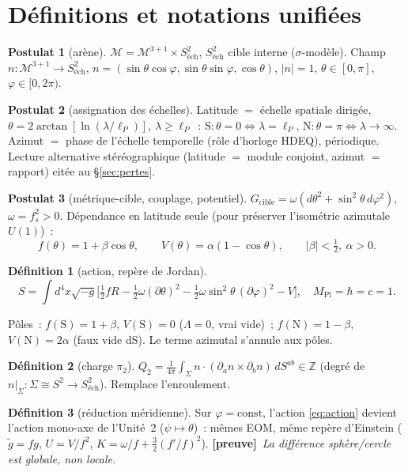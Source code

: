 \documentclass[11pt]{article}
\newcommand{\preuve}{{\small\textbf{[preuve]}}}
\newcommand{\Spole}{\mathrm{S}}
\newcommand{\Npole}{\mathrm{N}}
\newcommand{\Mp}{M_{\mathrm{Pl}}}
\newcommand{\lP}{\ell_P}
\newcommand{\Stwo}{S^2_{\text{\'ech}}}
\theoremstyle{definition}
\newtheorem{post}{Postulat}
\newtheorem{defi}{D\'efinition}
\begin{document}
\section{D\'efinitions et notations unifi\'ees}
\begin{post}[ar\`ene]\label{P1}
$\mathcal{M}=\mathcal{M}^{3+1}\times\Stwo$, $\Stwo$ cible interne ($\sigma$-mod\`ele). Champ
$n:\mathcal{M}^{3+1}\to\Stwo$, $n=(\sin\theta\cos\varphi,\sin\theta\sin\varphi,\cos\theta)$, $|n|=1$,
$\theta\in[0,\pi]$, $\varphi\in[0,2\pi)$.
\end{post}
\begin{post}[assignation des \'echelles]\label{P2}
Latitude $=$ \'echelle spatiale dirig\'ee, $\theta=2\arctan[\ln(\lambda/\lP)]$, $\lambda\ge\lP$~:
$\Spole:\theta{=}0\Leftrightarrow\lambda{=}\lP$, $\Npole:\theta{=}\pi\Leftrightarrow\lambda{\to}\infty$.
Azimut $=$ phase de l'\'echelle temporelle (r\^ole d'horloge HDEQ), p\'eriodique. Lecture alternative
st\'er\'eographique (latitude $=$ module conjoint, azimut $=$ rapport) cit\'ee au \S\ref{sec:pertes}.
\end{post}
\begin{post}[m\'etrique-cible, couplage, potentiel]\label{P3}
$G_{\text{cible}}=\omega(d\theta^2+\sin^2\!\theta\,d\varphi^2)$, $\omega=f_s^2>0$. D\'ependance en
latitude seule (pour pr\'eserver l'isom\'etrie azimutale $U(1)$)~:
\begin{equation}\label{eq:fV}
f(\theta)=1+\beta\cos\theta,\qquad V(\theta)=\alpha(1-\cos\theta),\qquad |\beta|<\tfrac12,\ \alpha>0.
\end{equation}
\end{post}
\begin{defi}[action, rep\`ere de Jordan]
\begin{equation}\label{eq:action}
S=\int d^4x\sqrt{-g}\Big[\tfrac12 fR-\tfrac12\omega(\partial\theta)^2
-\tfrac12\omega\sin^2\!\theta\,(\partial\varphi)^2-V\Big],\quad \Mp=\hbar=c=1.
\end{equation}
\end{defi}
\noindent P\^oles~: $f(\Spole)=1+\beta$, $V(\Spole)=0$ ($\Lambda=0$, vrai vide)~;
$f(\Npole)=1-\beta$, $V(\Npole)=2\alpha$ (faux vide dS). Le terme azimutal s'annule aux p\^oles.
\begin{defi}[charge $\pi_2$]
$Q_2=\frac{1}{4\pi}\int_\Sigma n\cdot(\partial_a n\times\partial_b n)\,dS^{ab}\in\mathbb{Z}$
(degr\'e de $n|_\Sigma:\Sigma\cong S^2\to\Stwo$). Remplace l'enroulement.
\end{defi}
\begin{defi}[r\'eduction m\'eridienne]\label{def:merid}
Sur $\varphi=\mathrm{const}$, l'action \eqref{eq:action} devient l'action mono-axe de l'Unit\'e~2
($\psi\mapsto\theta$)~: m\^emes EOM, m\^eme rep\`ere d'Einstein ($\tilde g=fg$, $U=V/f^2$,
$K=\omega/f+\tfrac32(f'/f)^2$). \preuve\ \emph{La diff\'erence sph\`ere/cercle est globale, non locale.}
\end{defi}
\end{document}
